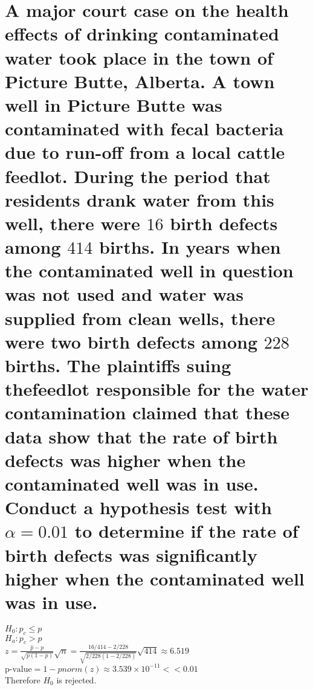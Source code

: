\documentclass[10pt, letterpaper, titlepage]{article}
\newcommand{\pv}{\text{p-value}}
\begin{document}
    \section{A major court case on the health effects of drinking contaminated water took place in the town of Picture Butte, 
        Alberta. A town well in Picture Butte was contaminated with fecal bacteria due to run-off from a local cattle feedlot. 
        During the period that residents drank water from this well, there were $16$ birth defects among $414$ births. 
        In years when the contaminated well in question was not used and water was supplied from clean wells, 
        there were two birth defects among $228$ births. 
        The plaintiffs suing thefeedlot responsible for the water contamination claimed that these data show 
        that the rate of birth defects was higher when the contaminated well was in use. 
        Conduct a hypothesis test with $\alpha=0.01$ to determine if the rate of birth defects was significantly higher when the 
        contaminated well was in use.}
        $H_0: p_c \leq p$\\
        $H_a: p_c > p$\\
        $z = \frac{\hat p - p}{\sqrt{p(1-p)}}\sqrt{n}
            = \frac{16/414 - 2/228}{\sqrt{2/228 (1 - 2/228)}}\sqrt{414}
            \approx 6.519$\\
        $\pv = 1 - pnorm(z) \approx 3.539 \times 10^{-11} << 0.01$\\
        Therefore $H_0$ is rejected.

    \newpage
\end{document}
